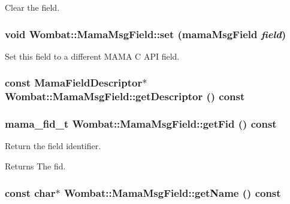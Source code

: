Clear the field. \hypertarget{classWombat_1_1MamaMsgField_ac8dfdbb37065c064a08bf1193328d692}{
\subsubsection[{set}]{\setlength{\rightskip}{0pt plus 5cm}void Wombat::MamaMsgField::set (mamaMsgField {\em field})}}
\label{classWombat_1_1MamaMsgField_ac8dfdbb37065c064a08bf1193328d692}


Set this field to a different MAMA C API field. \hypertarget{classWombat_1_1MamaMsgField_a12e62353f1d39d655a1e004218351963}{
\subsubsection[{getDescriptor}]{\setlength{\rightskip}{0pt plus 5cm}const {\bf MamaFieldDescriptor}$\ast$ Wombat::MamaMsgField::getDescriptor () const}}
\label{classWombat_1_1MamaMsgField_a12e62353f1d39d655a1e004218351963}
\hypertarget{classWombat_1_1MamaMsgField_a998420c9fc3f7fa20ec55cb57134c3df}{
\subsubsection[{getFid}]{\setlength{\rightskip}{0pt plus 5cm}mama\_\-fid\_\-t Wombat::MamaMsgField::getFid () const}}
\label{classWombat_1_1MamaMsgField_a998420c9fc3f7fa20ec55cb57134c3df}


Return the field identifier. \begin{DoxyReturn}{Returns}
The fid. 
\end{DoxyReturn}
\hypertarget{classWombat_1_1MamaMsgField_a198a3d93ba4073fe5b0081a5eb6f9339}{
\subsubsection[{getName}]{\setlength{\rightskip}{0pt plus 5cm}const char$\ast$ Wombat::MamaMsgField::getName () const}}
\label{classWombat_1_1MamaMsgField_a198a3d93ba4073fe5b0081a5eb6f9339}


